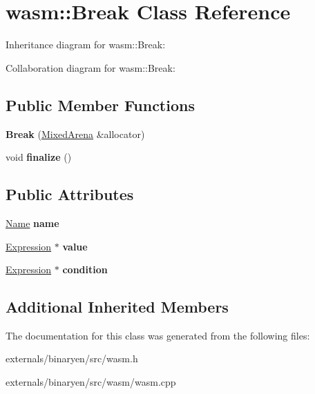 \hypertarget{classwasm_1_1_break}{}\section{wasm\+:\+:Break Class Reference}
\label{classwasm_1_1_break}


Inheritance diagram for wasm\+:\+:Break\+:


Collaboration diagram for wasm\+:\+:Break\+:
\subsection*{Public Member Functions}
\begin{DoxyCompactItemize}
\item 
\mbox{\label{classwasm_1_1_break_aa1dffe647c1634f93b442723638f0a18}} 
{\bfseries Break} (\mbox{\hyperlink{struct_mixed_arena}{Mixed\+Arena}} \&allocator)
\item 
\mbox{\label{classwasm_1_1_break_a1a5c2efed5e4ac4236cda04c406a7230}} 
void {\bfseries finalize} ()
\end{DoxyCompactItemize}
\subsection*{Public Attributes}
\begin{DoxyCompactItemize}
\item 
\mbox{\label{classwasm_1_1_break_a8a30b3c40e8a0596d060603284945912}} 
\mbox{\hyperlink{structwasm_1_1_name}{Name}} {\bfseries name}
\item 
\mbox{\label{classwasm_1_1_break_aa6a702eaba16535fc6dd2fb7ae17ea5c}} 
\mbox{\hyperlink{classwasm_1_1_expression}{Expression}} $\ast$ {\bfseries value}
\item 
\mbox{\label{classwasm_1_1_break_ac71486b3cf621a1ebb3a69e0e8766e44}} 
\mbox{\hyperlink{classwasm_1_1_expression}{Expression}} $\ast$ {\bfseries condition}
\end{DoxyCompactItemize}
\subsection*{Additional Inherited Members}


The documentation for this class was generated from the following files\+:\begin{DoxyCompactItemize}
\item 
externals/binaryen/src/wasm.\+h\item 
externals/binaryen/src/wasm/wasm.\+cpp\end{DoxyCompactItemize}
